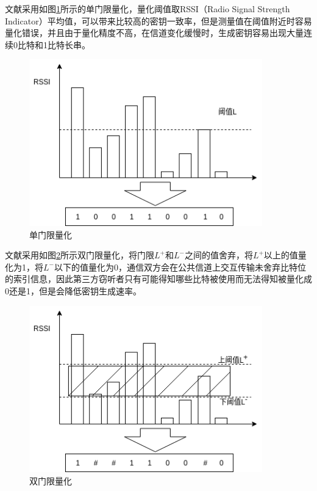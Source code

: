 \documentclass[master]{seuthesis} %
\begin{document}
\begin{Main}
文献\citet{aono2005wireless}采用如图\ref{single_quantization}所示的单门限量化，量化阈值取RSSI（Radio Signal Strength Indicator）平均值，可以带来比较高的密钥一致率，但是测量值在阈值附近时容易量化错误，并且由于量化精度不高，在信道变化缓慢时，生成密钥容易出现大量连续0比特和1比特长串。

\begin{figure}[htbp!]
    \centering \includegraphics[width=0.9\textwidth]{images/single_quantization} 
    \caption{单门限量化}
    \label{single_quantization}
\end{figure}

文献\citet{mathur2008radio}采用如图\ref{two_quantization}所示双门限量化，将门限$L^+$和$L^-$之间的值舍弃，将$L^+$以上的值量化为1，将$L^-$以下的值量化为0，通信双方会在公共信道上交互传输未舍弃比特位的索引信息，因此第三方窃听者只有可能得知哪些比特被使用而无法得知被量化成0还是1，但是会降低密钥生成速率。

\begin{figure}[htbp!]
    \centering \includegraphics[width=0.9\textwidth]{images/two_quantization} 
    \caption{双门限量化}
    \label{two_quantization}
\end{figure}


\end{Main}
\end{document}
